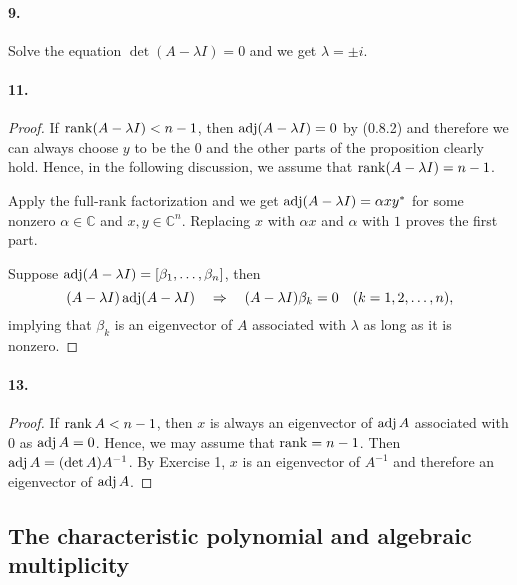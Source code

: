   \paragraph{9.}
  \begin{solution}
    Solve the equation $\det(A-\lambda I) = 0$ and we get $\lambda=\pm i$.
  \end{solution}

  \paragraph{11.}
  \begin{proof}
    If $\operatorname{rank}(A-\lambda I)<n-1$, then $\operatorname{adj}(A-\lambda I)=0$ by (0.8.2) and 
    therefore we can always choose $y$ to be the $0$ and the other parts of the 
    proposition clearly hold. Hence, in the following discussion, we assume that
    $\operatorname{rank}(A-\lambda I)=n-1$. \par
    Apply the full-rank factorization and we get $\operatorname{adj}(A-\lambda I)=\alpha xy^*$
    for some nonzero $\alpha\in\mathbb{C}$ and $x,y\in\mathbb{C}^n$. Replacing 
    $x$ with $\alpha x$ and $\alpha$ with $1$ proves the first part.\par
    Suppose $\operatorname{adj}(A-\lambda I)=[\beta_1,\dots,\beta_n]$, then
    \[
      (A-\lambda I)\operatorname{adj}(A-\lambda I) \quad\Rightarrow\quad
      (A-\lambda I)\beta_k = 0 \quad(k=1,2,\dots,n),
    \]
    implying that $\beta_k$ is an eigenvector of $A$ associated with $\lambda$ 
    as long as it is nonzero.
  \end{proof}

  \paragraph{13.}
  \begin{proof}
    If $\operatorname{rank} A < n -1$, then $x$ is always an eigenvector of $\operatorname{adj} A$ 
    associated with $0$ as $\operatorname{adj} A = 0$. Hence, we may assume that $\operatorname{rank} = n - 
    1$. Then $\operatorname{adj} A = (\det A)A^{-1}$. By Exercise 1, $x$ is an eigenvector of 
    $A^{-1}$ and therefore an eigenvector of $\operatorname{adj} A$.
  \end{proof}
  

\subsection{The characteristic polynomial and algebraic multiplicity}
